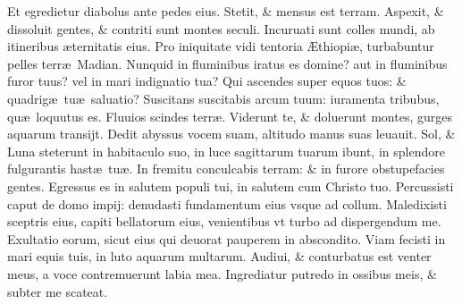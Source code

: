 \documentclass[a5paper,10pt]{book}
\def\ae{æ}
\def\AE{Æ}
\begin{document}
\begin{multicols*}{2}
\newline \color{red} E\color{black}t egredietur diabolus ante pedes eius. Stetit, \& mensus est terram.
\newline \color{red} A\color{black}spexit, \& dissoluit gentes, \& contriti sunt montes seculi.
\newline \color{red} I\color{black}ncuruati sunt colles mundi, ab itineribus \ae ternitatis eius.
\newline \color{red} P\color{black}ro iniquitate vidi tentoria \AE thiopi\ae , turbabuntur pelles terr\ae \ Madian.
\newline \color{red} N\color{black}unquid in fluminibus iratus es domine? aut in fluminibus furor tuus? vel in mari indignatio tua?
\newline \color{red} Q\color{black}ui ascendes super equos tuos: \& quadrig\ae \ tu\ae \ saluatio?
\newline \color{red} S\color{black}uscitans suscitabis arcum tuum: iuramenta tribubus, qu\ae \ loquutus es.
\newline \color{red} F\color{black}luuios scindes terr\ae . Viderunt te, \& doluerunt montes, gurges aquarum transijt.
\newline \color{red} D\color{black}edit abyssus vocem suam, altitudo manus suas leuauit.
\newline \color{red} S\color{black}ol, \& Luna steterunt in habitaculo suo, in luce sagittarum tuarum ibunt, in splendore fulgurantis hast\ae \ tu\ae .
\newline \color{red} I\color{black}n fremitu conculcabis terram: \& in furore obstupefacies gentes.
\newline \color{red} E\color{black}gressus es in salutem populi tui, in salutem cum Christo tuo.
\newline \color{red} P\color{black}ercussisti caput de domo impij: denudasti fundamentum eius vsque ad collum.
\newline \color{red} M\color{black}aledixisti sceptris eius, capiti bellatorum eius, venientibus vt turbo ad dispergendum me.
\newline \color{red} E\color{black}xultatio eorum, sicut eius qui deuorat pauperem in abscondito.
\newline \color{red} V\color{black}iam fecisti in mari equis tuis, in luto aquarum multarum.
\newline \color{red} A\color{black}udiui, \& conturbatus est venter meus, a voce contremuerunt labia mea.
\newline \color{red} I\color{black}ngrediatur putredo in ossibus meis, \& subter me scateat.

\end{multicols*}
\end{document}
